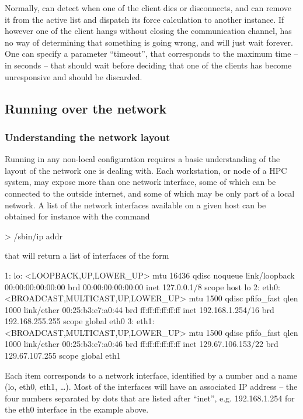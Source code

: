 \documentclass[11pt,english,fleqn]{report}
\newenvironment{code}{%
\footnotesize 
\verbatim
}{
\endverbatim
\normalsize
}
\begin{document}
Normally, \ipi can detect when one of the client dies or disconnects,
and can remove it from the active list and dispatch its force calculation
to another instance. If however one of the client hangs without 
closing the communication channel, \ipi has no way of determining that
something is going wrong, and will just wait forever. One can 
specify a parameter ``timeout'', that corresponds to the maximum time -- in 
seconds -- that \ipi should wait before deciding that one of the clients
has become unresponsive and should be discarded.

\subsection{Running \ipi over the network}

\subsubsection{Understanding the network layout}

Running \ipi in any non-local configuration requires a basic understanding
of the layout of the network one is dealing with. Each workstation, or node
of a HPC system, may expose more than one network interface, some of which
can be connected to the outside internet, and some of which may be only part
of a local network. A list of the network interfaces available on a given host
can be obtained for instance with the command

\begin{code}
> /sbin/ip addr
\end{code}

that will return a list of interfaces of the form

\begin{code}
1: lo: <LOOPBACK,UP,LOWER_UP> mtu 16436 qdisc noqueue 
    link/loopback 00:00:00:00:00:00 brd 00:00:00:00:00:00
    inet 127.0.0.1/8 scope host lo
2: eth0: <BROADCAST,MULTICAST,UP,LOWER_UP> mtu 1500 qdisc pfifo_fast qlen 1000
    link/ether 00:25:b3:e7:a0:44 brd ff:ff:ff:ff:ff:ff
    inet 192.168.1.254/16 brd 192.168.255.255 scope global eth0
3: eth1: <BROADCAST,MULTICAST,UP,LOWER_UP> mtu 1500 qdisc pfifo_fast qlen 1000
    link/ether 00:25:b3:e7:a0:46 brd ff:ff:ff:ff:ff:ff
    inet 129.67.106.153/22 brd 129.67.107.255 scope global eth1
\end{code}

Each item corresponds to a network interface, identified by a number and a name (lo, eth0, eth1, \ldots).
Most of the interfaces will have an associated IP address -- the four numbers separated by dots
that are listed after ``inet'', e.g. 192.168.1.254 for the eth0 interface in the example above.
\end{document}
